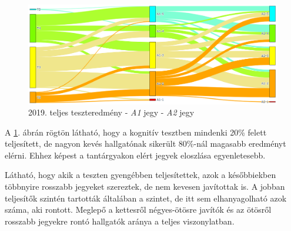 \documentclass[12pt]{article}
\begin{document}





\begin{figure}[H]
\centering
\includegraphics[width = \textwidth]{kepek/teszt-a1-a2.png}
\caption{2019. teljes teszteredmény - \textit{A1} jegy - \textit{A2} jegy}
\label{fig:teszt-a1-a2}
\end{figure}

A \ref{fig:teszt-a1-a2}. ábrán rögtön látható, hogy a kognitív tesztben mindenki 20\% felett teljesített, de nagyon kevés hallgatónak sikerült 80\%-nál magasabb eredményt elérni. Ehhez képest a tantárgyakon elért jegyek eloszlása egyenletesebb. 

Látható, hogy akik a teszten gyengébben teljesítettek, azok a későbbiekben többnyire rosszabb jegyeket szereztek, de nem kevesen javítottak is. A jobban teljesítők szintén tartották általában a szintet, de itt sem elhanyagolható azok száma, aki rontott. Meglepő a kettesről négyes-ötösre javítók és az ötösről rosszabb jegyekre rontó hallgatók aránya a teljes viszonylatban.
\end{document}
